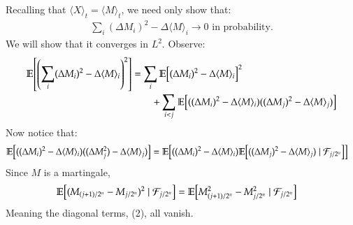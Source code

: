 \documentclass[12pt]{article}
\theoremstyle{definitionstyle}
\newcommand{\1}{\mathds 1}
\newcommand{\E}{\mathbb E \qty}
\newcommand{\qv}[1]{\langle #1 \rangle}
\begin{document}
    Recalling that $\qv{X}_t = \qv{M}_t$, we need only show that:
    \begin{align*}
        \sum_i (\Delta M_i)^2 - \Delta \qv{M}_i \to 0 \text{ in probability.}
    \end{align*}
    We will show that it converges in $L^2$. Observe:
    \begin{align}
        \E[\qty(\sum_i (\Delta M_i)^2 - \Delta \qv{M}_i)^2] &= \sum_i \E [(\Delta M_i)^2 - \Delta \qv{M}_i]^2 \\
        &\qquad + \sum_{i < j} \E[((\Delta M_i)^2 - \Delta \qv{M}_i)((\Delta M_j)^2 - \Delta \qv{M}_j)]
    \end{align}
    Now notice that:
    \begin{align*}
        \E[((\Delta M_i)^2 - \Delta \qv{M}_i)((\Delta M_j^2) - \Delta \qv{M}_j)] &= \E[((\Delta M_i)^2 - \Delta \qv{M}_i) \E[((\Delta M_j)^2 - \Delta \qv{M}_j) \mid \mathcal F_{j/2^n}]]
    \end{align*}
    Since $M$ is a martingale,
    \begin{align*}
        \E[(M_{(j+1)/2^n} - M_{j/2^n})^2 \mid \mathcal F_{j/2^n}] &= \E[M_{(j+1)/2^n}^2 - M_{j/2^n}^2 \mid \mathcal F_{j/2^n}]
    \end{align*}
    Meaning the diagonal terms, (2), all vanish. 
    
\end{document}
